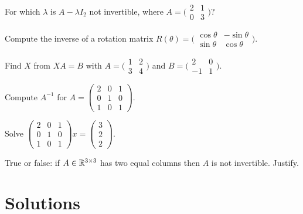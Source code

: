 \begin{problems}
    \item For which $\lambda$ is $A - \lambda I_{2}$ not invertible, where $A = \bigl(\begin{smallmatrix} 2 & 1 \\ 0 & 3 \end{smallmatrix}\bigr)$?
    \item Compute the inverse of a rotation matrix $R(\theta) = \bigl(\begin{smallmatrix} \cos \theta & -\sin \theta \\ \sin \theta & \cos \theta \end{smallmatrix}\bigr)$.
    \item Find $X$ from $X A = B$ with $A = \bigl(\begin{smallmatrix} 1 & 2 \\ 3 & 4 \end{smallmatrix}\bigr)$ and $B = \bigl(\begin{smallmatrix} 2 & 0 \\ -1 & 1 \end{smallmatrix}\bigr)$.
    \item Compute $A^{-1}$ for $A = \begin{pmatrix} 2 & 0 & 1 \\ 0 & 1 & 0 \\ 1 & 0 & 1 \end{pmatrix}$.
    \item Solve $\begin{pmatrix} 2 & 0 & 1 \\ 0 & 1 & 0 \\ 1 & 0 & 1 \end{pmatrix} x = \begin{pmatrix} 3 \\ 2 \\ 2 \end{pmatrix}$.
    \item True or false: if $A \in \mathbb{R}^{3 \times 3}$ has two equal columns then $A$ is not invertible. Justify.
\end{problems}

\section{Solutions}

